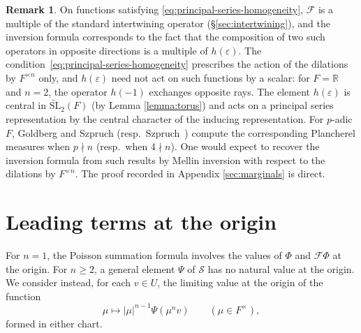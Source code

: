 \documentclass[reqno]{amsart}
\theoremstyle{plain}
\theoremstyle{definition}
\newtheorem{remark}[theorem]{Remark}
\theoremstyle{itplain}
\numberwithin{equation}{section}
\numberwithin{theorem}{section}
\begin{document}
\begin{remark}
  On functions satisfying \eqref{eq:principal-series-homogeneity}, $\mathcal{F}$ is a multiple of the standard intertwining operator (\S\ref{sec:intertwining}), and the inversion formula corresponds to the fact that the composition of two such operators in opposite directions is a multiple of $h(\varepsilon)$.  The condition~\eqref{eq:principal-series-homogeneity} prescribes the action of the dilations by $F^{\times n}$ only, and $h(\varepsilon)$ need not act on such functions by a scalar: for $F = \mathbb{R}$ and $n = 2$, the operator $h(-1)$ exchanges opposite rays.  The element $h(\varepsilon)$ is central in $\widetilde{\mathrm{SL}}_2(F)$ (by Lemma \ref{lemma:torus}) and acts on a principal series representation by the central character of the inducing representation.  For $p$-adic $F$, Goldberg and Szpruch \cite{MR3544420} (resp.\ Szpruch~\cite{Szpruch2019}) compute the corresponding Plancherel measures when $p \nmid n$ (resp.\ when $4 \nmid n$).  One would expect to recover the inversion formula from such results by Mellin inversion with respect to the dilations by $F^{\times n}$.  The proof recorded in Appendix \ref{sec:marginals} is direct.
\end{remark}

\section{Leading terms at the origin}\label{sec:germs}
For $n = 1$, the Poisson summation formula involves the values of $\Phi$ and $\mathcal{F} \Phi$ at the origin.  For $n \geq 2$, a general element $\Psi$ of $\mathcal{S}$ has no natural value at the origin.  We consider instead, for each $v \in U$, the limiting value at the origin of the function
\begin{equation}\label{eq:normalized-ray}
  \mu \mapsto \lvert \mu \rvert^{n-1} \Psi(\mu^n v)
  \qquad (\mu \in F^\times),
\end{equation}
formed in either chart.
\end{document}
